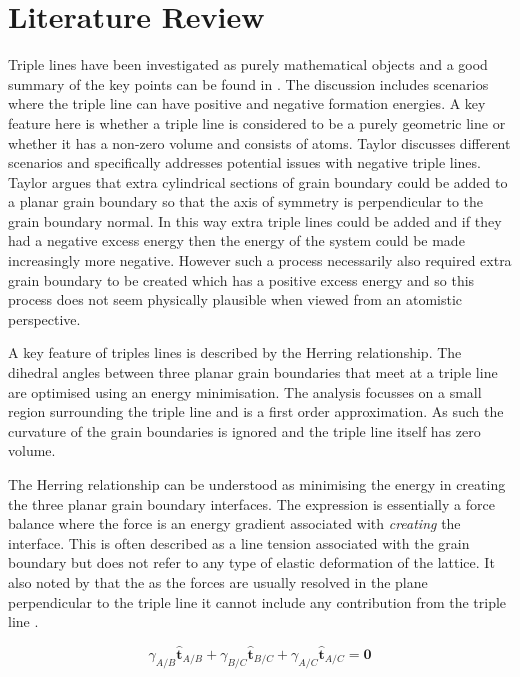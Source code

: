 \documentclass[12pt,a4paper]{book}
\begin{document}
\chapter{Literature Review} \label{ch:lr}

 
Triple lines have been investigated as purely mathematical objects and a good summary of the key points can be found in \cite{Taylor1999}. The discussion includes scenarios where the triple line can have positive and negative formation energies. A key feature here is whether a triple line is considered to be a purely geometric line or whether it has a non-zero volume and consists of atoms. Taylor discusses different scenarios and specifically addresses potential issues with negative triple lines. Taylor argues that extra cylindrical sections of grain boundary could be added to a planar grain boundary so that the axis of symmetry is perpendicular to the grain boundary normal. In this way extra triple lines could be added and if they had a negative excess energy then the energy of the system could be made increasingly more negative. However such a process necessarily also required extra grain boundary to be created which has a positive excess energy and so this process does not seem physically plausible when viewed from an atomistic perspective.

A key feature of triples lines is described by the Herring relationship. The dihedral angles between three planar grain boundaries that meet at a triple line are optimised using an energy minimisation. The analysis focusses on a small region surrounding the triple line and is a first order approximation. As such the curvature of the grain boundaries is ignored and the triple line itself has zero volume. 

The Herring relationship can be understood as minimising the energy in creating the three planar grain boundary interfaces. The expression is essentially a force balance where the force is an energy gradient associated with \emph{creating} the interface. This is often described as a line tension associated with the grain boundary but does not refer to any type of elastic deformation of the lattice. It also noted by \citeauthor{CRAIGCARTER} that the as the forces are usually resolved in the plane perpendicular to the triple line it cannot include any contribution from the triple line \cite{CRAIGCARTER}. 
     
\[\gamma_{A/B}\mathbf{\hat{t}}_{A/B} + \gamma_{B/C}\mathbf{\hat{t}}_{B/C} + \gamma_{A/C}\mathbf{\hat{t}}_{A/C} =\mathbf{0} \]
\end{document}
